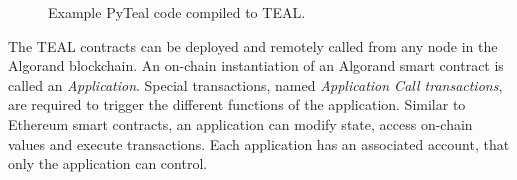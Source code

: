 \begin{figure}[!htbp]
    \centering
    \hfill
    \caption{Example PyTeal code compiled to \ac{TEAL}.}
    \label{fig:pyteal-teal}
\end{figure}

The \ac{TEAL} contracts can be deployed and remotely called from any node in the Algorand blockchain. An on-chain instantiation of an Algorand smart contract is called an \textit{Application}. Special transactions, named \textit{Application Call transactions}, are required to trigger the different functions of the application. Similar to Ethereum smart contracts, an application can modify state, access on-chain values and execute transactions. Each application has an associated account, that only the application can control.

